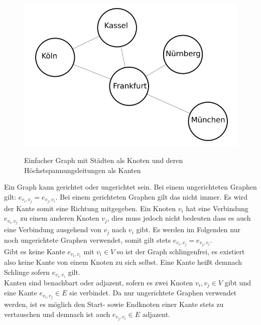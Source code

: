 \begin{figure}[t]
	\centering
	{\includegraphics[scale=0.5]{bilder/einfachergraph}\label{fig_einfachergraph}
	}\\
	\caption[Einfacher Graph mit Städten als Knoten und deren Höchstspannungsleitungen als Kanten]{Einfacher Graph mit Städten als Knoten und deren Höchstspannungsleitungen als Kanten}
	\label{fig_einfachergraph}
\end{figure}

Ein Graph kann gerichtet oder ungerichtet sein. Bei einem ungerichteten Graphen gilt: $e_{v_{i},v_{j}} = e_{v_{j},v_{i}}$. Bei einem gerichteten Graphen gilt das nicht immer. Es wird der Kante somit eine Richtung mitgegeben. Ein Knoten $v_{i}$ hat eine Verbindung $e_{v_{i},v_{j}}$ zu einem anderen Knoten $v_{j}$, dies muss jedoch nicht bedeuten dass es auch eine Verbindung ausgehend von $v_{j}$ nach $v_{i}$ gibt. Es werden im Folgenden nur noch ungerichtete Graphen verwendet, somit gilt stets  $e_{v_{i},v_{j}} = e_{v_{j},v_{i}}$.\\

Gibt es keine Kante $e_{v_{i},v_{i}}$ mit $v_{i} \in V$ so ist der Graph schlingenfrei, es existiert also keine Kante von einem Knoten zu sich selbst. Eine Kante heißt demnach Schlinge sofern $e_{v_{i},v_{i}}$ gilt. \\

Kanten sind benachbart oder adjazent, sofern es zwei Knoten $v_{i},v_{j} \in V$ gibt und eine Kante $e_{v_{i},v_{j}} \in E$ sie verbindet. Da nur ungerichtete Graphen verwendet werden, ist es möglich den Start- sowie Endknoten einer Kante stets zu vertauschen und demnach ist auch $e_{v_{j},v_{i}} \in E$ adjazent. \\

